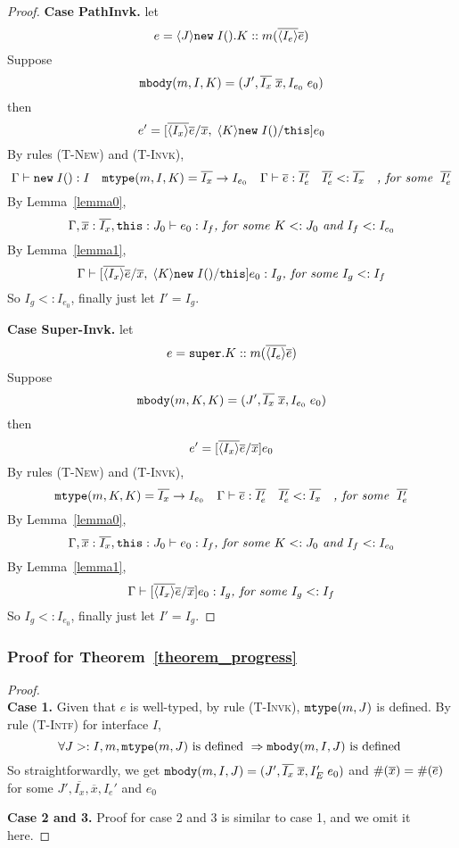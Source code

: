\begin{proof}
\noindent \textbf{Case PathInvk.}
let \[ e = \langle J \rangle\texttt{new} \; I().K::m(\overline{\langle I_e \rangle} \overline{e}) \]  
Suppose \[ \texttt{mbody}(m, I, K) = (J', \overline{I_x} \; \overline{x}, I_{e_0} \; e_0) \] 
then \[ e' =  [\overline{\langle I_x \rangle} \overline{e}/\overline{x}, \; \langle K \rangle\texttt{new} \; I()/\texttt{this} ] e_0 \] 
By rules \textsc{(T-New)} and \textsc{(T-Invk)}, 
  \[ \Gamma \; {\vdash} \; \texttt{new} \; I():I \quad 
     \texttt{mtype}(m, I, K) = \overline{I_x} \rightarrow I_{e_0} \quad 
     \Gamma \; {\vdash} \; \overline{e} : \overline{I_e'} \quad
     \overline{I_e'} <: \overline{I_x} \quad
     \textit{, for some } \; \overline{I_e'}
  \]
By Lemma~\ref{lemma0},
    \[
    \Gamma, \overline{x}:\overline{I_x}, \texttt{this}:J_0 \; {\vdash} \; e_0:I_f \textit{, for some } K <: J_0 \textit{ and } I_f <: I_{e_0}
    \]
By Lemma~\ref{lemma1},
    \[
    \Gamma \; {\vdash} \; [\overline{\langle I_x \rangle} \overline{e}/\overline{x}, \; \langle K \rangle\texttt{new} \; I()/\texttt{this} ] e_0  :  I_g \textit{, for some } I_g <: I_f 
    \]
So $I_g <: I_{e_0}$, finally just let $I' = I_g$.

\noindent \textbf{Case Super-Invk.}
let \[ e = \texttt{super}.K::m(\overline{\langle I_e \rangle} \overline{e}) \]   
Suppose \[ \texttt{mbody}(m, K, K) = (J', \overline{I_x} \; \overline{x}, I_{e_0} \; e_0) \] 
then \[ e' =  [\overline{\langle I_x \rangle} \overline{e}/\overline{x}] e_0 \] 
By rules \textsc{(T-New)} and \textsc{(T-Invk)}, 
  \[ 
     \texttt{mtype}(m, K, K) = \overline{I_x} \rightarrow I_{e_0} \quad 
     \Gamma \; {\vdash} \; \overline{e} : \overline{I_e'} \quad
     \overline{I_e'} <: \overline{I_x} \quad
     \textit{, for some } \; \overline{I_e'}
  \]
By Lemma~\ref{lemma0},
    \[
    \Gamma, \overline{x}:\overline{I_x}, \texttt{this}:J_0 \; {\vdash} \; e_0:I_f \textit{, for some } K <: J_0 \textit{ and } I_f <: I_{e_0}
    \]
By Lemma~\ref{lemma1},
    \[
    \Gamma \; {\vdash} \; [\overline{\langle I_x \rangle} \overline{e}/\overline{x} ] e_0  :  I_g \textit{, for some } I_g <: I_f 
    \]
So $I_g <: I_{e_0}$, finally just let $I' = I_g$.

\end{proof}

\subsubsection{Proof for Theorem~\ref{theorem_progress}}
\begin{proof}~\\
\noindent \textbf{Case 1.}
Given that $e$ is well-typed, by rule \textsc{(T-Invk)}, $\texttt{mtype}(m, J)$ is defined.
By rule \textsc{(T-Intf)} for interface $I$,
    \[ \forall J >: I, m, \texttt{mtype}(m, J) \text{ is defined } \Rightarrow \texttt{mbody}(m, I, J) \text{ is defined } \]
So straightforwardly, we get $ \texttt{mbody}(m, I, J) = (J', \overline{I_x} \; \overline{x}, I'_E \; e_0) $ and
         $\#(\overline{x}) = \#(\overline{e})$ for some $J', \overline{I_x}, \overline{x}, I_e'$ and $e_0$
         
\noindent \textbf{Case 2 and 3.} Proof for case 2 and 3 is similar to case 1, and we omit it here.
\end{proof}